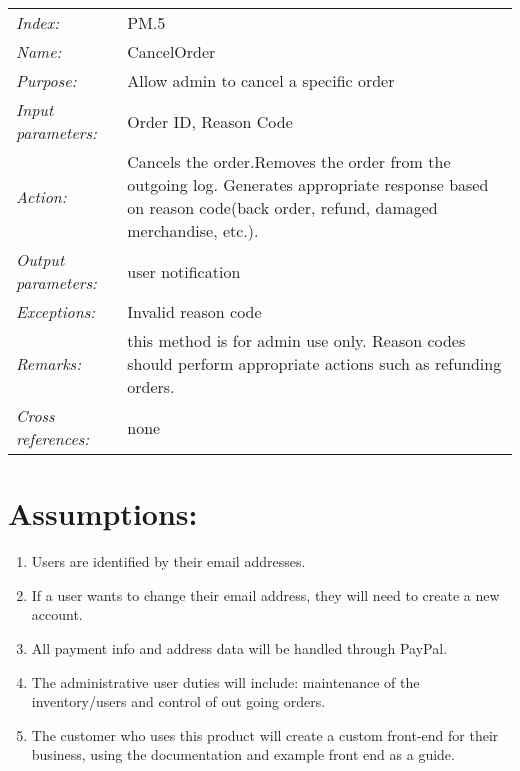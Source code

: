\documentclass[10pt,letter]{article}
\begin{document}
\begin{tabularx}{\textwidth}{l X}
    \it{Index:} & PM.5 \\
    \it{Name:} & CancelOrder \\
    \it{Purpose:} &  Allow admin to cancel a specific order\\
    \it{Input parameters:} &  Order ID, Reason Code\\
    \it{Action:} & Cancels the order.Removes the order from the outgoing log. Generates appropriate response based on reason code(back order, refund, damaged merchandise, etc.).\\
    \it{Output parameters:} & user notification\\
    \it{Exceptions:} & Invalid reason code\\
    \it{Remarks:} & this method is for admin use only. Reason codes should perform appropriate actions such as refunding orders. \\
    \it{Cross references:} & none\\
    \hline
\end{tabularx}

\section{Assumptions:}
\begin{enumerate}
    \item Users are identified by their email addresses.
    \item If a user wants to change their email address, they will need to create a new account.
    \item All payment info and address data will be handled through PayPal.
    \item The administrative user duties will include: maintenance of the inventory/users and control of out going orders. 
    \item The customer who uses this product will create a custom front-end for their business, using the documentation and example front end as 
        a guide.
\end{enumerate}
\end{document}
